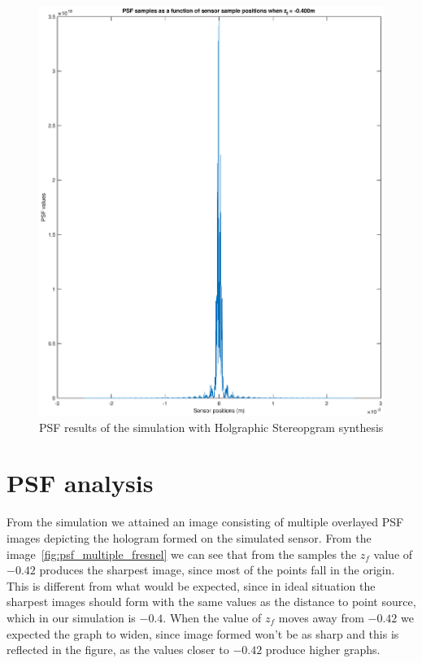 \documentclass[12pt,a4paper,english
]{tunithesis}
\begin{document}
\begin{figure}
  \centering
  \includegraphics[width=\columnwidth]{img/psf_single_hs.eps}
  \caption{PSF results of the simulation with Holgraphic Stereopgram synthesis}
  \label{fig:psf_single_hs}
\end{figure}



\section{PSF analysis}
From the simulation we attained an image consisting of multiple overlayed PSF images depicting the hologram formed on the simulated sensor. From the image~\ref{fig:psf_multiple_fresnel} we can see that from the samples the $z_f$ value of $-0.42$ produces the sharpest image, since most of the points fall in the origin. This is different from what would be expected, since in ideal situation the sharpest images should form with the same values as the distance to point source, which in our simulation is $-0.4$. When the value of $z_f$ moves away from $-0.42$ we expected the graph to widen, since image formed won't be as sharp and this is reflected in the figure, as the values closer to $-0.42$ produce higher graphs.
\end{document}
